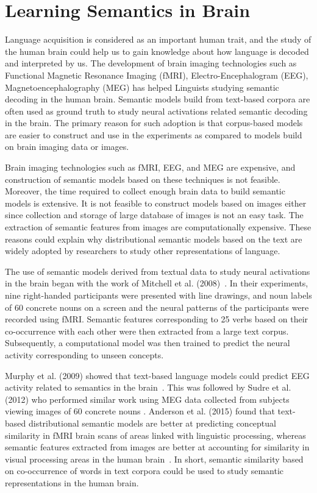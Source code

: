 \section{Learning Semantics in Brain}

Language acquisition is considered as an important human trait, and the study of the human brain could help us to gain knowledge about how language is decoded and interpreted by us. The development of brain imaging technologies such as Functional Magnetic Resonance Imaging (fMRI), Electro-Encephalogram (EEG), Magnetoencephalography (MEG) has helped Linguists studying semantic decoding in the human brain. Semantic models build from text-based corpora are often used as ground truth to study neural activations related semantic decoding in the brain. The primary reason for such adoption is that corpus-based models are easier to construct and use in the experiments as compared to models build on brain imaging data or images.

Brain imaging technologies such as fMRI, EEG, and MEG are expensive, and construction of semantic models based on these techniques is not feasible. Moreover, the time required to collect enough brain data to build semantic models is extensive. It is not feasible to construct models based on images either since collection and storage of large database of images is not an easy task. The extraction of semantic features from images are computationally expensive. These reasons could explain why distributional semantic models based on the text are widely adopted by researchers to study other representations of language.

The use of semantic models derived from textual data to study neural activations in the brain began with the work of  Mitchell et al. (2008)~\cite{Mitchell1191}. In their experiments, nine right-handed participants were presented with line drawings, and noun labels of 60 concrete nouns on a screen and the neural patterns of the participants were recorded using fMRI. Semantic features corresponding to 25 verbs based on their co-occurrence with each other were then extracted from a large text corpus. Subsequently, a computational model was then trained to predict the neural activity corresponding to unseen concepts.

Murphy et al. (2009) showed that text-based language models could predict EEG activity related to semantics in the brain~\cite{MurphyEEG}.  This was followed by Sudre et al. (2012) who performed similar work using MEG data collected from subjects viewing images of 60 concrete nouns \cite{SUDRE2012451}. Anderson et al. (2015) found that text-based distributional semantic models are better at predicting conceptual similarity in fMRI brain scans of areas linked with linguistic processing, whereas semantic features extracted from images are better at accounting for similarity in visual processing areas in the human brain~\cite{andersonBrainEyes}. In short, semantic similarity based on co-occurrence of words in text corpora could be used to study semantic representations in the human brain.

